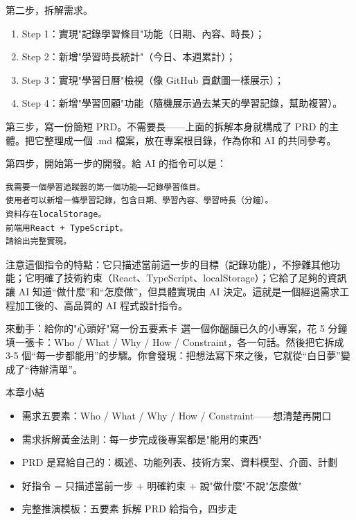 第二步，拆解需求。

\begin{enumerate}
  \item Step 1：實現"記錄學習條目"功能（日期、內容、時長）；
  \item Step 2：新增"學習時長統計"（今日、本週累計）；
  \item Step 3：實現"學習日曆"檢視（像 GitHub 貢獻圖一樣展示）；
  \item Step 4：新增"學習回顧"功能（隨機展示過去某天的學習記錄，幫助複習）。
\end{enumerate}

第三步，寫一份簡短 PRD。不需要長——上面的拆解本身就構成了 PRD 的主體。把它整理成一個 .md 檔案，放在專案根目錄，作為你和 AI 的共同參考。

第四步，開始第一步的開發。給 AI 的指令可以是：

\begin{lstlisting}
我需要一個學習追蹤器的第一個功能——記錄學習條目。
使用者可以新增一條學習記錄，包含日期、學習內容、學習時長（分鐘）。
資料存在localStorage。
前端用React + TypeScript。
請給出完整實現。
\end{lstlisting}

注意這個指令的特點：它只描述當前這一步的目標（記錄功能），不摻雜其他功能；它明確了技術約束（React、TypeScript、localStorage）；它給了足夠的資訊讓 AI 知道“做什麼”和“怎麼做”，但具體實現由 AI 決定。這就是一個經過需求工程加工後的、高品質的 AI 程式設計指令。

\begin{tcbpractice}{來動手：給你的"心頭好"寫一份五要素卡}
選一個你醞釀已久的小專案，花 5 分鐘填一張卡：Who / What / Why / How / Constraint，各一句話。然後把它拆成 3-5 個“每一步都能用”的步驟。你會發現：把想法寫下來之後，它就從“白日夢”變成了“待辦清單”。

\end{tcbpractice}

\begin{tcbsummary}{本章小結}
\begin{itemize}
  \item 需求五要素：Who / What / Why / How / Constraint——想清楚再開口
  \item 需求拆解黃金法則：每一步完成後專案都是"能用的東西"
  \item PRD 是寫給自己的：概述、功能列表、技術方案、資料模型、介面、計劃
  \item 好指令 = 只描述當前一步 + 明確約束 + 說"做什麼"不說"怎麼做"
  \item 完整推演模板：五要素 拆解 PRD 給指令，四步走
\end{itemize}

\end{tcbsummary}
